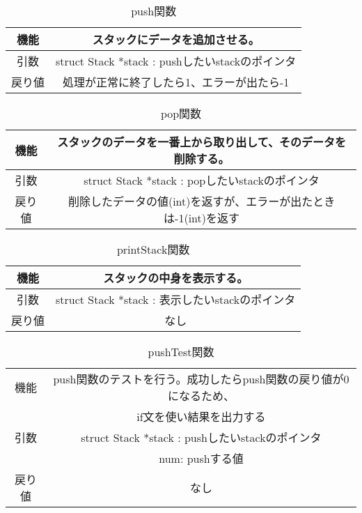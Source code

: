 \documentclass[a4paper,11pt]{jsarticle}
\begin{document}
\begin{table}[ht]
  \centering
  \begin{tabular}{|c|c|}
    \hline
    機能  & スタックにデータを追加させる。                         \\
    \hline
    引数  & struct Stack *stack : pushしたいstackのポインタ \\
    \hline
    戻り値 & 処理が正常に終了したら1、エラーが出たら-1                  \\
    \hline
  \end{tabular}
  \caption{push関数}
  \label{tab:push_func}
\end{table}
\begin{table}[ht]
  \centering
  \begin{tabular}{|c|c|}
    \hline
    機能  & スタックのデータを一番上から取り出して、そのデータを削除する。        \\
    \hline
    引数  & struct Stack *stack : popしたいstackのポインタ \\
    \hline
    戻り値 & 削除したデータの値(int)を返すが、エラーが出たときは-1(int)を返す \\
    \hline
  \end{tabular}
  \caption{pop関数}
  \label{tab:pop_func}
\end{table}
\begin{table}[ht]
  \centering
  \begin{tabular}{|c|c|}
    \hline
    機能  & スタックの中身を表示する。                         \\
    \hline
    引数  & struct Stack *stack : 表示したいstackのポインタ \\
    \hline
    戻り値 & なし                                    \\
    \hline
  \end{tabular}
  \caption{printStack関数}
  \label{tab:printstack_func}
\end{table}
\begin{table}[ht]
  \centering
  \begin{tabular}{|c|c|}
    \hline
    機能  & push関数のテストを行う。成功したらpush関数の戻り値が0になるため、   \\ &if文を使い結果を出力する           \\
    \hline
    引数  & struct Stack *stack : pushしたいstackのポインタ \\
        & num: pushする値                            \\
    \hline
    戻り値 & なし                                      \\
    \hline
  \end{tabular}
  \caption{pushTest関数}
  \label{tab:pushtest_func}
\end{table}
\end{document}
